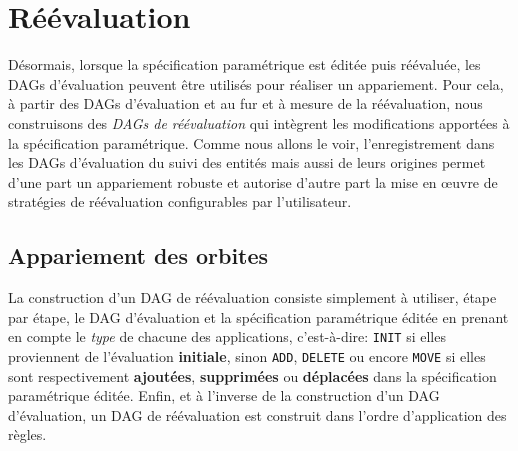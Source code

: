 \section{Réévaluation}
\label{sec:reevaluation-base-regles-reevaluation}


Désormais, lorsque la spécification paramétrique est éditée puis réévaluée, les DAGs d'évaluation peuvent être utilisés pour réaliser un appariement. %
Pour cela, à partir des DAGs d'évaluation et au fur et à mesure de la réévaluation, nous construisons des \emph{DAGs de réévaluation} qui intègrent les modifications apportées à la spécification paramétrique. %
Comme nous allons le voir, l'enregistrement dans les DAGs d'évaluation du suivi des entités mais aussi de leurs origines permet d'une part un appariement robuste et autorise d'autre part la mise en \oe uvre de stratégies de réévaluation configurables par l'utilisateur. %


\subsection{Appariement des orbites}
\label{sec:reevaluation-base-regles-reevaluation-dag-reevaluation}

La construction d'un DAG de réévaluation
consiste simplement à utiliser, étape par étape, le DAG d'évaluation et la spécification paramétrique éditée en
prenant en compte le \emph{type} de chacune des applications, c'est-à-dire:
\texttt{INIT} si elles proviennent de l'évaluation \textbf{initiale}, sinon
\texttt{ADD}, \texttt{DELETE} ou encore \texttt{MOVE} si elles sont respectivement
\textbf{ajoutées}, \textbf{supprimées} ou \textbf{déplacées} dans la
spécification paramétrique éditée. %
Enfin, et à l'inverse de la construction d'un DAG d'évaluation, un DAG de
réévaluation est construit dans l'ordre d'application des règles. %

